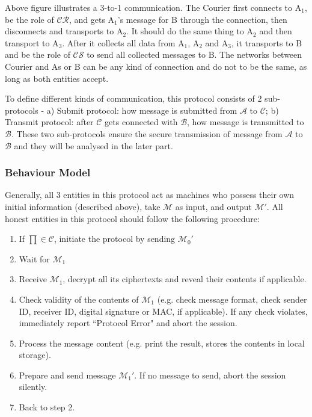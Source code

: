 \documentclass[10pt,a4paper]{article}
\begin{document}
Above figure illustrates a 3-to-1 communication. The Courier first connects to A$_1$, be the role of $\mathcal{CR}$, and gets A$_1$'s message for B through the connection, then disconnects and transports to A$_2$. It should do the same thing to A$_2$ and then transport to A$_3$. After it collects all data from A$_1$, A$_2$ and A$_3$, it transports to B and be the role of $\mathcal{CS}$ to send all collected messages to B. The networks between Courier and As or B can be any kind of connection and do not to be the same, as long as both entities accept. 

To define different kinds of communication, this protocol consists of 2 sub-protocols - a) Submit protocol: how message is submitted from $\mathcal{A}$ to $\mathcal{C}$; b) Transmit protocol: after $\mathcal{C}$ gets connected with $\mathcal{B}$, how message is transmitted to $\mathcal{B}$. These two sub-protocols ensure the secure transmission of message from $\mathcal{A}$ to $\mathcal{B}$ and they will be analysed in the later part.

\subsubsection*{Behaviour Model}
Generally, all 3 entities in this protocol act as machines who possess their own initial information (described above), take $\mathcal{M}$ as input, and output $\mathcal{M'}$. All honest entities in this protocol should follow the following procedure:
\begin{enumerate}
\item If $\prod \in \mathcal{C}$, initiate the protocol by sending ${\mathcal{M}_0}'$
\item Wait for $\mathcal{M}_1$
\item Receive $\mathcal{M}_1$, decrypt all its ciphertexts and reveal their contents if applicable.
\item Check validity of the contents of $\mathcal{M}_1$ (e.g. check message format, check sender ID, receiver ID, digital signature or MAC, if applicable). If any check violates, immediately report ``Protocol Error" and abort the session.
\item Process the message content (e.g. print the result, stores the contents in local storage).
\item Prepare and send message ${\mathcal{M}_1}'$. If no message to send, abort the session silently.
\item Back to step 2.
\end{enumerate}
\end{document}
